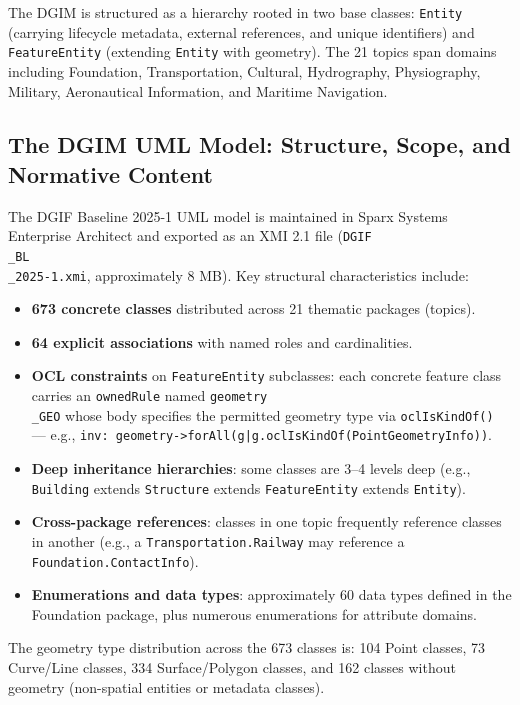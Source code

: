 \documentclass[conference]{IEEEtran}
\begin{document}
The DGIM is structured as a hierarchy rooted in two base classes: \texttt{Entity} (carrying lifecycle metadata, external references, and unique identifiers) and \texttt{FeatureEntity} (extending \texttt{Entity} with geometry). The 21 topics span domains including Foundation, Transportation, Cultural, Hydrography, Physiography, Military, Aeronautical Information, and Maritime Navigation.

\subsection{The DGIM UML Model: Structure, Scope, and Normative Content}

The DGIF Baseline 2025-1 UML model is maintained in Sparx Systems Enterprise Architect and exported as an XMI 2.1 file (\texttt{DGIF\\_BL\\_2025-1.xmi}, approximately 8 MB). Key structural characteristics include:

\begin{itemize}[leftmargin=*]
\item \textbf{673 concrete classes} distributed across 21 thematic packages (topics).
\item \textbf{64 explicit associations} with named roles and cardinalities.
\item \textbf{OCL constraints} on \texttt{FeatureEntity} subclasses: each concrete feature class carries an \texttt{ownedRule} named \texttt{geometry\\_GEO} whose body specifies the permitted geometry type via \texttt{oclIsKindOf()} — e.g., \texttt{inv: geometry->forAll(g|g.oclIsKindOf(PointGeometryInfo))}.
\item \textbf{Deep inheritance hierarchies}: some classes are 3–4 levels deep (e.g., \texttt{Building} extends \texttt{Structure} extends \texttt{FeatureEntity} extends \texttt{Entity}).
\item \textbf{Cross-package references}: classes in one topic frequently reference classes in another (e.g., a \texttt{Transportation.Railway} may reference a \texttt{Foundation.ContactInfo}).
\item \textbf{Enumerations and data types}: approximately 60 data types defined in the Foundation package, plus numerous enumerations for attribute domains.
\end{itemize}

The geometry type distribution across the 673 classes is: 104 Point classes, 73 Curve/Line classes, 334 Surface/Polygon classes, and 162 classes without geometry (non-spatial entities or metadata classes).
\end{document}
